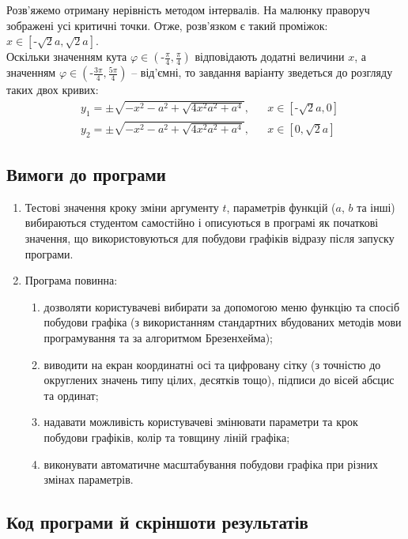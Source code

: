 \documentclass[a4paper,14pt]{extarticle} %
\begin{document}
Розв'яжемо отриману нерівність методом інтервалів. На малюнку праворуч зображені усі критичні точки. 
Отже, розв'язком є такий проміжок: $x \in [\text{-}\sqrt{2}a,\sqrt{2}a]$. \\

Оскільки значенням кута $\varphi \in (\text{-}\tfrac{\pi}{4},\tfrac{\pi}{4})$ відповідають додатні величини $x$,
а значенням $\varphi \in (\text{-}\tfrac{3\pi}{4}, \tfrac{5\pi}{4})$ -- від'ємні, то завдання варіанту зведеться 
до розгляду таких двох кривих:
\begin{align*}
    &y_1=\pm \sqrt{-x^2-a^2+\sqrt{4x^2a^2 + a^4}}, &&x \in [\text{-}\sqrt{2}a,0] \\
    &y_2=\pm \sqrt{-x^2-a^2+\sqrt{4x^2a^2 + a^4}}, &&x \in [0,\sqrt{2}a]
\end{align*}

\subsection*{Вимоги до програми}

\begin{enumerate}
    \item Тестові значення кроку зміни аргументу $t$, параметрів функцій ($a$, $b$ та інші) вибираються 
    студентом самостійно і описуються в програмі як початкові значення, що використовуються для побудови 
    графіків відразу після запуску програми.
    \item Програма повинна:
    \begin{enumerate}
        \item дозволяти користувачеві вибирати за допомогою меню функцію та спосіб побудови графіка 
        (з використанням стандартних вбудованих методів мови програмування та за алгоритмом Брезенхейма);
        \item виводити на екран координатні осі та цифровану сітку (з точністю до округлених значень типу цілих, 
        десятків тощо), підписи до вісей абсцис та ординат;
        \item надавати можливість користувачеві змінювати параметри та крок побудови графіків, колір та 
        товщину ліній графіка;
        \item виконувати автоматичне масштабування побудови графіка при різних змінах параметрів.
    \end{enumerate}
\end{enumerate}

\subsection*{Код програми й скріншоти результатів}
\end{document}

